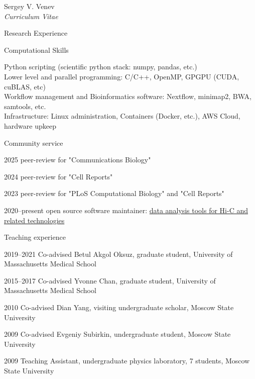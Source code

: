 \documentclass[10pt]{article}
\newenvironment{sublist}{%
    \begin{list}{}{%
        \setlength{\itemsep}{0em}\setlength{\parsep}{0em}%
        \setlength{\topsep}{0em}\setlength{\parskip}{0em}%
    }%
}%
{ \end{list} }
\begin{document}
\begin{cv}{Sergey V. Venev\\{\large \itshape Curriculum Vitae}}
\begin{cvlist}{Research Experience}
\end{cvlist}
\setlength{\cvlabelwidth}{\oldcvlabelwidth}

\setlength{\oldcvlabelwidth}{\cvlabelwidth}
\setlength{\cvlabelwidth}{1em}
\begin{cvlist}{Computational Skills}
        \item Python scripting (scientific python stack: numpy, pandas, etc.)\\
        Lower level and parallel programming: C/C++, OpenMP, GPGPU (CUDA, cuBLAS, etc)\\
        Workflow management and Bioinformatics software: Nextflow, minimap2, BWA, samtools, etc.\\
        Infrastructure: Linux administration, Containers (Docker, etc.), AWS Cloud, hardware upkeep
\end{cvlist}
\setlength{\cvlabelwidth}{\oldcvlabelwidth}


\setlength{\oldcvlabelwidth}{\cvlabelwidth}
\setlength{\cvlabelwidth}{1em}
\begin{cvlist}{Community service}
        \item[2025] peer-review for "Communications Biology"
        \item[2024] peer-review for "Cell Reports"
        \item[2023] peer-review for "PLoS Computational Biology" and "Cell Reports"
        \item[2020--present] open source software maintainer: \href{https://open2c.github.io}{data analysis tools for Hi-C and related technologies}
\end{cvlist}
\setlength{\cvlabelwidth}{\oldcvlabelwidth}


\setlength{\oldcvlabelwidth}{\cvlabelwidth}
\setlength{\cvlabelwidth}{1em}
\begin{cvlist}{Teaching experience}
        \item[2019--2021] Co-advised Betul Akgol Oksuz, graduate student, University of Massachusetts Medical School
        \item[2015--2017] Co-advised Yvonne Chan, graduate student, University of Massachusetts Medical School
        \item[2010] Co-advised Dian Yang, visiting undergraduate scholar, Moscow State University
        \item[2009] Co-advised Evgeniy Subirkin, undergraduate student, Moscow State University
        \item[2009] Teaching Assistant, undergraduate physics laboratory, 7 students, Moscow State University
\end{cvlist}
\setlength{\cvlabelwidth}{\oldcvlabelwidth}



\end{cv}
\end{document}
